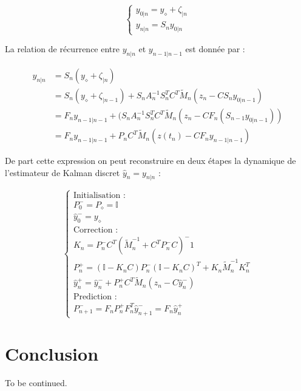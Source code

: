 \documentclass[a4paper]{article}
\begin{document}
\[
\begin{cases}
	y_{0|n} = y_{\diamond} + \zeta_{|n} \\
	y_{n|n} = S_n y_{0|n} 
\end{cases}
\]

La relation de récurrence entre $y_{n|n}$ et $y_{n-1|n-1}$ est donnée par :

\[
\begin{split}
y_{n|n} &= S_n (y_{\diamond} + \zeta_{|n}) \\
        &= S_n (y_{\diamond} + \zeta_{|n-1}) + S_n A_{n}^{-1}S_n^T C^T \tilde{M}_n (z_n-C S_n y_{0|n-1}) \\
		&= F_n y_{n-1|n-1} + (S_nA_{n}^{-1} S_n^TC^T \tilde{M}_n (z_n -CF_n( S_{n-1} y_{0|n-1})) \\
		&= F_n y_{n-1|n-1} + P_n C^T \tilde{M}_n (z(t_n)-CF_ny_{n-1|n-1})		
\end{split}
\]


De part cette expression on peut reconstruire en deux étapes la dynamique de l'estimateur de Kalman discret $\hat{y}_n = y_{n|n}$ : 

\[
\begin{cases}
		\text{Initialisation :}\\
		P_0^- = P_{\diamond} = \mathbb{I} \\
		\hat{y}_0^- = y_{\diamond} \\
		\text{Correction :}\\
		K_n = P_n^- C^T (\tilde{M}_n^{-1} + C^TP_n^-C)^-1 \\
		P_n^+ = (\mathbb{I} - K_nC)P_n^-(\mathbb{I}-K_nC)^T + K_n \tilde{M}_n^{-1} K_n^T\\
		\hat{y}_n^+ = \hat{y}_n^- + P_n^+C^T \tilde{M}_n ( z_n - C \hat{y}_n^-)\\
		\text{Prediction :}\\
		P_{n+1}^- = F_n P_n^+ F_n^T
		\hat{y}_{n+1}^- = F_n \hat{y}_n^+
	\end{cases}
\]
   

\section{Conclusion}

To be continued.


\medskip


	
\end{document}
